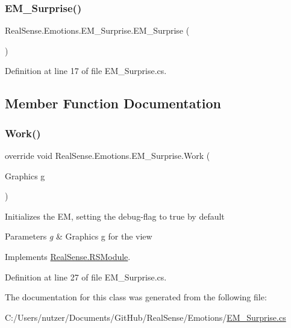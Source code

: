 \subsubsection{\texorpdfstring{E\+M\+\_\+\+Surprise()}{EM\_Surprise()}}
{\footnotesize\ttfamily Real\+Sense.\+Emotions.\+E\+M\+\_\+\+Surprise.\+E\+M\+\_\+\+Surprise (\begin{DoxyParamCaption}{ }\end{DoxyParamCaption})}



Definition at line 17 of file E\+M\+\_\+\+Surprise.\+cs.



\subsection{Member Function Documentation}
\mbox{\label{class_real_sense_1_1_emotions_1_1_e_m___surprise_a08040934bb081596a4b02b483dc3a662}} 
\subsubsection{\texorpdfstring{Work()}{Work()}}
{\footnotesize\ttfamily override void Real\+Sense.\+Emotions.\+E\+M\+\_\+\+Surprise.\+Work (\begin{DoxyParamCaption}\item[{Graphics}]{g }\end{DoxyParamCaption})\hspace{0.3cm}{\ttfamily [virtual]}}

Initializes the EM, setting the debug-\/flag to true by default 
\begin{DoxyParams}{Parameters}
{\em g} & Graphics g for the view \\
\hline
\end{DoxyParams}


Implements \hyperlink{class_real_sense_1_1_r_s_module_a2ec830b7932ee7c0077d473f81c73867}{Real\+Sense.\+R\+S\+Module}.



Definition at line 27 of file E\+M\+\_\+\+Surprise.\+cs.



The documentation for this class was generated from the following file\+:\begin{DoxyCompactItemize}
\item 
C\+:/\+Users/nutzer/\+Documents/\+Git\+Hub/\+Real\+Sense/\+Emotions/\hyperlink{_e_m___surprise_8cs}{E\+M\+\_\+\+Surprise.\+cs}\end{DoxyCompactItemize}
